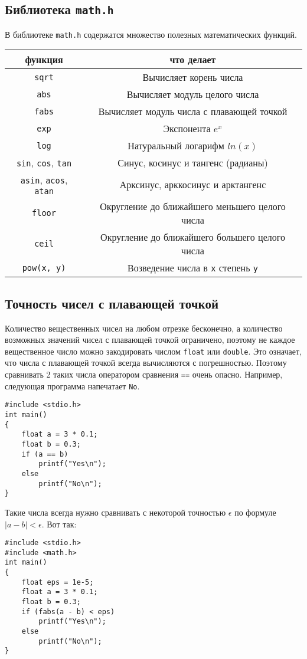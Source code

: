 \documentclass{article}
\begin{document}
\subsection*{Библиотека \texttt{math.h}}
В библиотеке \texttt{math.h} содержатся множество полезных математических функций.

\begin{center}
\begin{tabular}{ c c }
 функция & что делает \\ \hline
 \texttt{sqrt}     & Вычисляет корень числа \\ 
 \texttt{abs}      & Вычисляет модуль целого числа \\ 
 \texttt{fabs}     & Вычисляет модуль числа с плавающей точкой \\ 
 \texttt{exp}      & Экспонента $e^x$ \\ 
 \texttt{log}      & Натуральный логарифм $ln(x)$ \\
 \texttt{sin}, \texttt{cos},  \texttt{tan} & Синус, косинус и тангенс (радианы) \\ 
 \texttt{asin}, \texttt{acos},  \texttt{atan} & Арксинус, арккосинус и арктангенс \\ 
 \texttt{floor}      & Округление до ближайшего меньшего целого числа \\
 \texttt{ceil}       & Округление до ближайшего большего целого числа \\
 \texttt{pow(x, y)}        & Возведение числа в \texttt{x} степень \texttt{y} \\
\end{tabular}
\end{center}


\subsection*{Точность чисел с плавающей точкой}
Количество вещественных чисел на любом отрезке бесконечно, а количество возможных значений чисел с плавающей точкой ограничено, поэтому не каждое вещественное число можно закодировать числом \texttt{float} или \texttt{double}. Это означает, что числа с плавающей точкой всегда вычисляются с погрешностью. Поэтому сравнивать 2 таких числа оператором сравнения \texttt{==} очень опасно. Например, следующая программа напечатает \texttt{No}.
\begin{lstlisting}
#include <stdio.h>
int main() 
{
    float a = 3 * 0.1;
    float b = 0.3;
    if (a == b)
        printf("Yes\n");
    else
        printf("No\n");
}
\end{lstlisting}

Такие числа всегда нужно сравнивать с некоторой точностью $\epsilon$ по формуле $|a - b| < \epsilon$. Вот так:\\ 
\begin{lstlisting}
#include <stdio.h>
#include <math.h>
int main() 
{
    float eps = 1e-5;
    float a = 3 * 0.1;
    float b = 0.3;
    if (fabs(a - b) < eps)
        printf("Yes\n");
    else
        printf("No\n");
}
\end{lstlisting}
\end{document}
